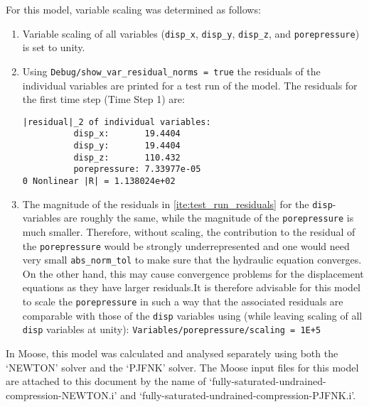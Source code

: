 For this model, variable scaling was determined as follows:
\begin{enumerate}
    \item Variable scaling of all variables (\texttt{disp\_x}, \texttt{disp\_y},
          \texttt{disp\_z}, and \texttt{porepressure}) is set to unity.
    \item\label{ite:test_run_residuals} {Using
              \texttt{Debug/show\_var\_residual\_norms = true} the residuals of the
              individual variables are printed for a test run of the model. The residuals for
              the first time step (Time Step 1) are:\vspace{0.1cm}
              \begin{mdframed}[leftmargin=0.1cm,innerleftmargin=0.1cm,topline=false,rightline=false,bottomline=false]
                  \begin{verbatim}
|residual|_2 of individual variables:
          disp_x:       19.4404
          disp_y:       19.4404
          disp_z:       110.432
          porepressure: 7.33977e-05
0 Nonlinear |R| = 1.138024e+02\end{verbatim}
              \end{mdframed}}
    \item The magnitude of the residuals in \autoref{ite:test_run_residuals} for the
          \texttt{disp}-variables are roughly the same, while the magnitude of the
          \texttt{porepressure} is much smaller. Therefore, without scaling, the
          contribution to the residual of the \texttt{porepressure} would be strongly
          underrepresented and one would need very small \texttt{abs\_norm\_tol} to make
          sure that the hydraulic equation converges. On the other hand, this may cause
          convergence problems for the displacement equations as they have larger
          residuals.\newline It is therefore advisable for this model to scale the
          \texttt{porepressure} in such a way that the associated residuals are
          comparable with those of the \texttt{disp} variables using (while leaving
          scaling of all \texttt{disp} variables at unity):
          \texttt{Variables/porepressure/scaling = 1E+5}

\end{enumerate}

In Moose, this model was calculated and analysed separately using both the
‘NEWTON’ solver and the ‘PJFNK’ solver. The Moose input files for this model
are attached to this document by the name of
‘fully-saturated-undrained-compression-NEWTON.i’ and
‘fully-saturated-undrained-compression-PJFNK.i’.

